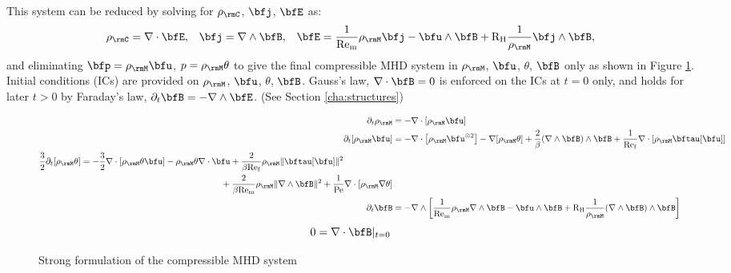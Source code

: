     This system can be reduced by solving for $\rho_{\rmC}$, $\bfj$, $\bfE$ as:
    \begin{align}
        \rho_{\rmC}  =  \nabla\cdot\bfE,  &&
               \bfj  =  \nabla\wedge\bfB,  &&
               \bfE  =  \frac{1}{\rmRem}\rho_{\rmM}\bfj - \bfu\wedge\bfB + \rmRH\frac{1}{\rho_{\rmM}}\bfj\wedge\bfB,
    \end{align}
    and eliminating $\bfp  =  \rho_{\rmM}\bfu$, $p  =  \rho_{\rmM}\theta$ to give the final compressible MHD system in $\rho_{\rmM}$, $\bfu$, $\theta$, $\bfB$ only as shown in Figure \ref{fig:compressible strong form}. Initial conditions (ICs) are provided on $\rho_{\rmM}$, $\bfu$, $\theta$, $\bfB$. Gauss's law, $\nabla\cdot\bfB  =  0$ is enforced on the ICs at $t  =  0$ only, and holds for later $t  >  0$ by Faraday's law, $\partial_{t}\bfB  =  - \nabla\wedge\bfE$. (See Section \ref{cha:structures})

    \begin{figure}
        \centering
        \line
        \begin{align}
                           \partial_{t}\rho_{\rmM}          &=  - \nabla\cdot[\rho_{\rmM}\bfu]  \\
                           \partial_{t}[\rho_{\rmM}\bfu]    &=  - \nabla\cdot\left[\rho_{\rmM}\bfu^{\otimes 2}\right] - \nabla[\rho_{\rmM}\theta] + \frac{2}{\beta}(\nabla\wedge\bfB)\wedge\bfB + \frac{1}{\rmRef}\nabla\cdot[\rho_{\rmM}\bftau[\bfu]]  \\
            \begin{split}
                \frac{3}{2}\partial_{t}[\rho_{\rmM}\theta]  &=  - \frac{3}{2}\nabla\cdot[\rho_{\rmM}\theta\bfu] - \rho_{\rmM}\theta\nabla\cdot\bfu + \frac{2}{\beta\rmRef}\rho_{\rmM}\|\bftau[\bfu]\|^{2}  \\
                    &\qquad\qquad\qquad\qquad\qquad\qquad\qquad\qquad+ \frac{2}{\beta\rmRem}\rho_{\rmM}\|\nabla\wedge\bfB\|^{2} + \frac{1}{\rmPe}\nabla\cdot[\rho_{\rmM}\nabla\theta]
            \end{split}  \\
                           \partial_{t}\bfB                 &=  - \nabla\wedge\left[\frac{1}{\rmRem}\rho_{\rmM}\nabla\wedge\bfB - \bfu\wedge\bfB + \rmRH\frac{1}{\rho_{\rmM}}(\nabla\wedge\bfB)\wedge\bfB\right]
        \end{align}
        \shortline
        \begin{equation}
            0  =  \nabla\cdot\bfB|_{t = 0}
        \end{equation}
        \line
        \caption{Strong formulation of the compressible MHD system}
        \label{fig:compressible strong form}
    \end{figure}

